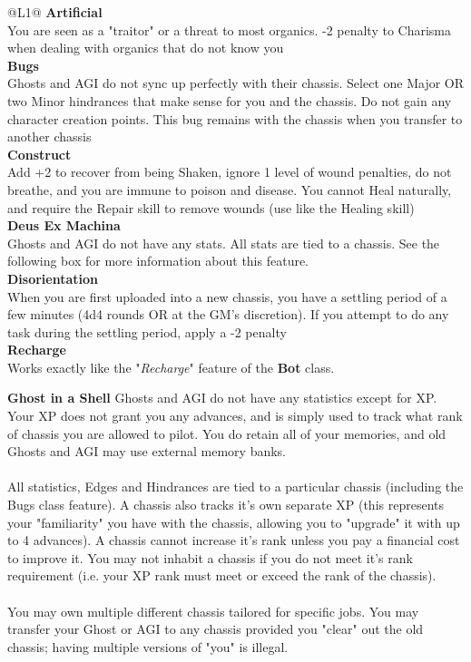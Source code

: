 \begin{redtable}{\linewidth}{@{}L{1}@{}}
  \textbf{Artificial}\\
  You are seen as a "traitor" or a threat to most organics. -2 penalty to Charisma when dealing with organics that do not know you\\
  \textbf{Bugs}\\
  Ghosts and AGI do not sync up perfectly with their chassis. Select one Major OR two Minor hindrances that make sense for you and the chassis. Do not gain any character creation points. This bug remains with the chassis when you transfer to another chassis\\
  \textbf{Construct}\\
  Add +2 to recover from being Shaken, ignore 1 level of wound penalties, do not breathe, and you are immune to poison and disease. You cannot Heal naturally, and require the Repair skill to remove wounds (use like the Healing skill)\\
  \textbf{Deus Ex Machina}\\
  Ghosts and AGI do not have any stats. All stats are tied to a chassis. See the following box for more information about this feature.\\
  \textbf{Disorientation}\\
  When you are first uploaded into a new chassis, you have a settling period of a few minutes (4d4 rounds OR at the GM's discretion). If you attempt to do any task during the settling period, apply a -2 penalty\\
  \textbf{Recharge}\\
  Works exactly like the "\textit{Recharge}" feature of the \textbf{Bot} class.\\
\end{redtable}

\vspace{\baselineskip}

\begin{commentbox}{\textbf{Ghost in a Shell}}
Ghosts and AGI do not have any statistics except for XP. Your XP does not grant you any advances, and is simply used to track what rank of chassis you are allowed to pilot. You do retain all of your memories, and old Ghosts and AGI may use external memory banks.\\
\\
All statistics, Edges and Hindrances are tied to a particular chassis (including the Bugs class feature). A chassis also tracks it's own separate XP (this represents your "familiarity" you have with the chassis, allowing you to "upgrade" it with up to 4 advances). A chassis cannot increase it's rank unless you pay a financial cost to improve it. You may not inhabit a chassis if you do not meet it's rank requirement (i.e. your XP rank must meet or exceed the rank of the chassis).\\
\\
You may own multiple different chassis tailored for specific jobs. You may transfer your Ghost or AGI to any chassis provided you "clear" out the old chassis; having multiple versions of "you" is illegal. 
\end{commentbox}
  
